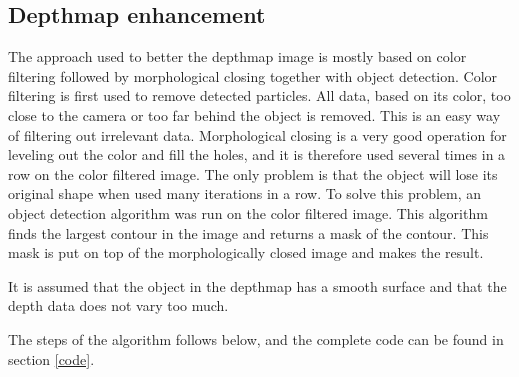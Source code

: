 

\subsection{Depthmap enhancement} \label{section:depthmap}

The approach used to better the depthmap image is mostly based on color filtering followed by morphological closing together with object detection. 
Color filtering is first used to remove detected particles. All data, based on its color, too close to the camera or too far behind the object is removed. This is an easy way of filtering out irrelevant data. Morphological closing is a very good operation for leveling out the color and fill the holes, and it is therefore used several times in a row on the color filtered image. The only problem is that the object will lose its original shape when used many iterations in a row. To solve this problem, an object detection algorithm was run on the color filtered image. This algorithm finds the largest contour in the image and returns a mask of the contour. This mask is put on top of the morphologically closed image and makes the result.

It is assumed that the object in the depthmap has a smooth surface and that the depth data does not vary too much.

The steps of the algorithm follows below, and the complete code can be found in section \ref{code}.

